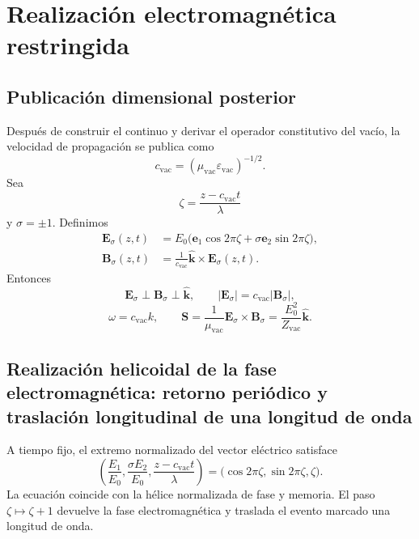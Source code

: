 \chapter{Realización electromagnética restringida}
\label{espiral:chap:realizacion-em}

\section{Publicación dimensional posterior}

Después de construir el continuo y derivar el operador constitutivo del
vacío, la velocidad de propagación se publica como
\[
 c_{\mathrm{vac}}=(\mu_{\mathrm{vac}}\varepsilon_{\mathrm{vac}})^{-1/2}.
\]
Sea
\[
 \zeta=\frac{z-c_{\mathrm{vac}}t}{\lambda}
\]
y \(\sigma=\pm1\). Definimos
\begin{align}
 \mathbf E_\sigma(z,t)
 &=E_0\bigl(
 \mathbf e_1\cos2\pi\zeta
 +\sigma\mathbf e_2\sin2\pi\zeta\bigr),\\
 \mathbf B_\sigma(z,t)
 &=\frac1{c_{\mathrm{vac}}}\widehat{\mathbf k}
 \times\mathbf E_\sigma(z,t).
 \label{espiral:eq:modo-em-circular}
\end{align}
Entonces
\[
 \mathbf E_\sigma\perp\mathbf B_\sigma\perp\widehat{\mathbf k},
 \qquad
 |\mathbf E_\sigma|=c_{\mathrm{vac}}|\mathbf B_\sigma|,
\]
\[
 \omega=c_{\mathrm{vac}}k,
 \qquad
 \mathbf S=\frac1{\mu_{\mathrm{vac}}}
 \mathbf E_\sigma\times\mathbf B_\sigma
 =\frac{E_0^2}{Z_{\mathrm{vac}}}\widehat{\mathbf k}.
\]

\section{Realización helicoidal de la fase electromagnética: retorno periódico y traslación longitudinal de una longitud de onda}

A tiempo fijo, el extremo normalizado del vector eléctrico satisface
\begin{equation}
 \left(
 \frac{E_1}{E_0},\frac{\sigma E_2}{E_0},
 \frac{z-c_{\mathrm{vac}}t}{\lambda}
 \right)
 =\bigl(\cos2\pi\zeta,\sin2\pi\zeta,\zeta\bigr).
 \label{espiral:eq:helice-em-fase-posicion}
\end{equation}
La ecuación coincide con la hélice normalizada de fase y memoria. El paso
\(\zeta\mapsto\zeta+1\) devuelve la fase electromagnética y traslada el
evento marcado una longitud de onda.

